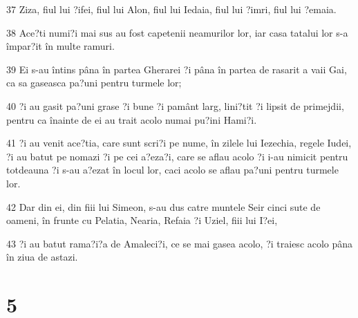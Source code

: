 \par 37 Ziza, fiul lui ?ifei, fiul lui Alon, fiul lui Iedaia, fiul lui ?imri, fiul lui ?emaia.
\par 38 Ace?ti numi?i mai sus au fost capetenii neamurilor lor, iar casa tatalui lor s-a împar?it în multe ramuri.
\par 39 Ei s-au întins pâna în partea Gherarei ?i pâna în partea de rasarit a vaii Gai, ca sa gaseasca pa?uni pentru turmele lor;
\par 40 ?i au gasit pa?uni grase ?i bune ?i pamânt larg, lini?tit ?i lipsit de primejdii, pentru ca înainte de ei au trait acolo numai pu?ini Hami?i.
\par 41 ?i au venit ace?tia, care sunt scri?i pe nume, în zilele lui Iezechia, regele Iudei, ?i au batut pe nomazi ?i pe cei a?eza?i, care se aflau acolo ?i i-au nimicit pentru totdeauna ?i s-au a?ezat în locul lor, caci acolo se aflau pa?uni pentru turmele lor.
\par 42 Dar din ei, din fiii lui Simeon, s-au dus catre muntele Seir cinci sute de oameni, în frunte cu Pelatia, Nearia, Refaia ?i Uziel, fiii lui I?ei,
\par 43 ?i au batut rama?i?a de Amaleci?i, ce se mai gasea acolo, ?i traiesc acolo pâna în ziua de astazi.

\chapter{5}

